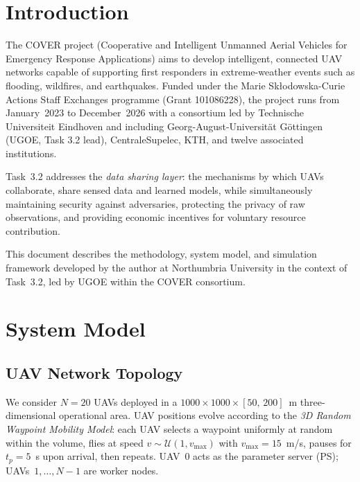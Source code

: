 \documentclass[12pt,a4paper]{article}
\begin{document}
\section{Introduction}

The COVER project (Cooperative and Intelligent Unmanned Aerial Vehicles for
Emergency Response Applications) aims to develop intelligent, connected UAV
networks capable of supporting first responders in extreme-weather events such as
flooding, wildfires, and earthquakes.  Funded under the Marie Sk\l{}odowska-Curie
Actions Staff Exchanges programme (Grant 101086228), the project runs from
January~2023 to December~2026 with a consortium led by Technische Universiteit
Eindhoven and including Georg-August-Universit\"at G\"ottingen (UGOE, Task 3.2 lead),
CentraleSupelec, KTH, and twelve associated institutions.

Task~3.2 addresses the \emph{data sharing layer}: the mechanisms by which UAVs
collaborate, share sensed data and learned models, while simultaneously maintaining
security against adversaries, protecting the privacy of raw observations, and
providing economic incentives for voluntary resource contribution.

This document describes the methodology, system model, and simulation framework
developed by the author at Northumbria University in the context of Task~3.2,
led by UGOE within the COVER consortium.

\section{System Model}

\subsection{UAV Network Topology}

We consider $N = 20$ UAVs deployed in a $1000 \times 1000 \times [50,\,200]$~m
three-dimensional operational area.  UAV positions evolve according to the
\emph{3D Random Waypoint Mobility Model}: each UAV selects a waypoint uniformly at
random within the volume, flies at speed $v \sim \mathcal{U}(1, v_{\max})$ with
$v_{\max} = 15$~m/s, pauses for $t_p = 5$~s upon arrival, then repeats.
UAV~0 acts as the parameter server (PS); UAVs~$1,\ldots,N-1$ are worker nodes.
\end{document}
